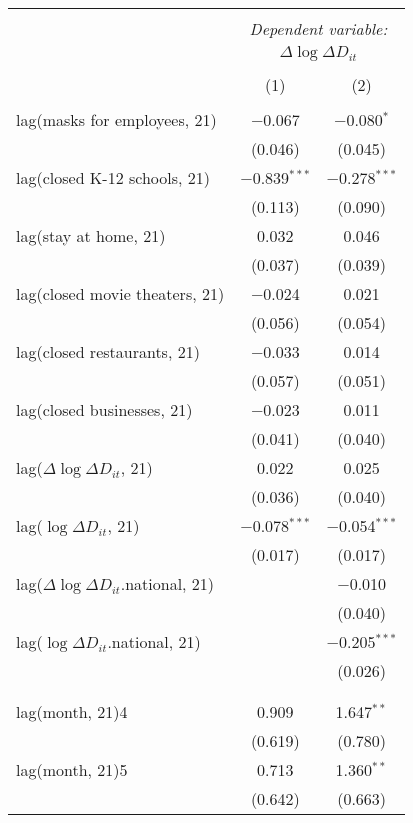 \begin{tabular}{@{\extracolsep{1pt}}lcc} 
\\[-1.8ex]\hline 
\hline \\[-1.8ex] 
 & \multicolumn{2}{c}{\textit{Dependent variable:}} \\ 
\cline{2-3} 
 & \multicolumn{2}{c}{$\Delta \log \Delta D_{it}$} \\ 
\\[-1.8ex] & (1) & (2)\\ 
\hline \\[-1.8ex] 
 lag(masks for employees, 21) & $-$0.067 & $-$0.080$^{*}$ \\ 
  & (0.046) & (0.045) \\ 
  lag(closed K-12 schools, 21) & $-$0.839$^{***}$ & $-$0.278$^{***}$ \\ 
  & (0.113) & (0.090) \\ 
  lag(stay at home, 21) & 0.032 & 0.046 \\ 
  & (0.037) & (0.039) \\ 
  lag(closed movie theaters, 21) & $-$0.024 & 0.021 \\ 
  & (0.056) & (0.054) \\ 
  lag(closed restaurants, 21) & $-$0.033 & 0.014 \\ 
  & (0.057) & (0.051) \\ 
  lag(closed businesses, 21) & $-$0.023 & 0.011 \\ 
  & (0.041) & (0.040) \\ 
  lag($\Delta \log \Delta D_{it}$, 21) & 0.022 & 0.025 \\ 
  & (0.036) & (0.040) \\ 
  lag($\log \Delta D_{it}$, 21) & $-$0.078$^{***}$ & $-$0.054$^{***}$ \\ 
  & (0.017) & (0.017) \\ 
  lag($\Delta \log \Delta D_{it}$.national, 21) &  & $-$0.010 \\ 
  &  & (0.040) \\ 
  lag($\log \Delta D_{it}$.national, 21) &  & $-$0.205$^{***}$ \\ 
  &  & (0.026) \\ 
   &  &  \\ 
  &  &  \\ 
  lag(month, 21)4 & 0.909 & 1.647$^{**}$ \\ 
  & (0.619) & (0.780) \\ 
  lag(month, 21)5 & 0.713 & 1.360$^{**}$ \\ 
  & (0.642) & (0.663) \\ 

\end{tabular}
